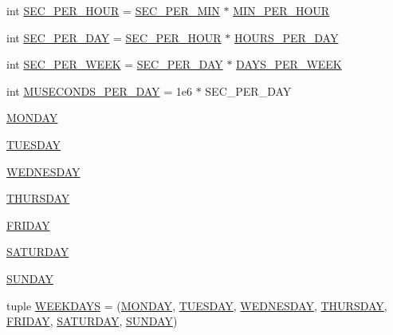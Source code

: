 \begin{DoxyCompactItemize}
\item 
int \hyperlink{namespacematplotlib_1_1dates_a4a0c89531083c0680da552974ddb2d13}{S\+E\+C\+\_\+\+P\+E\+R\+\_\+\+H\+O\+UR} = \hyperlink{namespacematplotlib_1_1dates_a172ba09abbadd87e4810d6ac8762cf44}{S\+E\+C\+\_\+\+P\+E\+R\+\_\+\+M\+IN} $\ast$ \hyperlink{namespacematplotlib_1_1dates_a75caa1103515f8db461fd6fa5b28fbfa}{M\+I\+N\+\_\+\+P\+E\+R\+\_\+\+H\+O\+UR}
\item 
int \hyperlink{namespacematplotlib_1_1dates_abf9d1f78a9268f2462873d9979b8a3a7}{S\+E\+C\+\_\+\+P\+E\+R\+\_\+\+D\+AY} = \hyperlink{namespacematplotlib_1_1dates_a4a0c89531083c0680da552974ddb2d13}{S\+E\+C\+\_\+\+P\+E\+R\+\_\+\+H\+O\+UR} $\ast$ \hyperlink{namespacematplotlib_1_1dates_a561a350df6e297468616ec46a3596a42}{H\+O\+U\+R\+S\+\_\+\+P\+E\+R\+\_\+\+D\+AY}
\item 
int \hyperlink{namespacematplotlib_1_1dates_a923d8a8d162c096c2494dd58ca0ef072}{S\+E\+C\+\_\+\+P\+E\+R\+\_\+\+W\+E\+EK} = \hyperlink{namespacematplotlib_1_1dates_abf9d1f78a9268f2462873d9979b8a3a7}{S\+E\+C\+\_\+\+P\+E\+R\+\_\+\+D\+AY} $\ast$ \hyperlink{namespacematplotlib_1_1dates_a2c3de14819f311d36b4b62828036d0ae}{D\+A\+Y\+S\+\_\+\+P\+E\+R\+\_\+\+W\+E\+EK}
\item 
int \hyperlink{namespacematplotlib_1_1dates_ae92b83deea7cb4e52ae94ec1a113b404}{M\+U\+S\+E\+C\+O\+N\+D\+S\+\_\+\+P\+E\+R\+\_\+\+D\+AY} = 1e6 $\ast$ S\+E\+C\+\_\+\+P\+E\+R\+\_\+\+D\+AY
\item 
\hyperlink{namespacematplotlib_1_1dates_a33dfa1d33cbbebe95092b647310133cc}{M\+O\+N\+D\+AY}
\item 
\hyperlink{namespacematplotlib_1_1dates_a68238181f37f9d090ab4833b6f25db1f}{T\+U\+E\+S\+D\+AY}
\item 
\hyperlink{namespacematplotlib_1_1dates_a6eb9f50c83c74cfff91d744a261c9ae5}{W\+E\+D\+N\+E\+S\+D\+AY}
\item 
\hyperlink{namespacematplotlib_1_1dates_aeb266ae70b586ae874354bfa8d627d03}{T\+H\+U\+R\+S\+D\+AY}
\item 
\hyperlink{namespacematplotlib_1_1dates_a98c04cbbc7ce4500f8462a5e83320285}{F\+R\+I\+D\+AY}
\item 
\hyperlink{namespacematplotlib_1_1dates_a438840c894f971e4be985e6363c432a2}{S\+A\+T\+U\+R\+D\+AY}
\item 
\hyperlink{namespacematplotlib_1_1dates_af79f27c0b2f2555e579995fac862198c}{S\+U\+N\+D\+AY}
\item 
tuple \hyperlink{namespacematplotlib_1_1dates_affa371e887e3f8e12bc2e22edddb9208}{W\+E\+E\+K\+D\+A\+YS} = (\hyperlink{namespacematplotlib_1_1dates_a33dfa1d33cbbebe95092b647310133cc}{M\+O\+N\+D\+AY}, \hyperlink{namespacematplotlib_1_1dates_a68238181f37f9d090ab4833b6f25db1f}{T\+U\+E\+S\+D\+AY}, \hyperlink{namespacematplotlib_1_1dates_a6eb9f50c83c74cfff91d744a261c9ae5}{W\+E\+D\+N\+E\+S\+D\+AY}, \hyperlink{namespacematplotlib_1_1dates_aeb266ae70b586ae874354bfa8d627d03}{T\+H\+U\+R\+S\+D\+AY}, \hyperlink{namespacematplotlib_1_1dates_a98c04cbbc7ce4500f8462a5e83320285}{F\+R\+I\+D\+AY}, \hyperlink{namespacematplotlib_1_1dates_a438840c894f971e4be985e6363c432a2}{S\+A\+T\+U\+R\+D\+AY}, \hyperlink{namespacematplotlib_1_1dates_af79f27c0b2f2555e579995fac862198c}{S\+U\+N\+D\+AY})
\end{DoxyCompactItemize}


